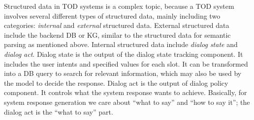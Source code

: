\documentclass[11pt,dvipdfm]{article}
\begin{document}

Structured data in TOD systems is a complex topic, because a TOD system involves several different types of structured data, mainly including two categories: \textit{internal} and \textit{external} structured data.
External structured data include the backend DB or KG, similar to the structured data for semantic parsing as mentioned above. 
Internal structured data include \textit{dialog state} and \textit{dialog act}.
Dialog state is the output of the dialog state tracking component.
It includes the user intents and specified values for each slot. It can be transformed into a DB query to search for relevant information, which may also be used by the model to decide the response.
Dialog act is the output of dialog policy component. It controls what the system response wants to achieve. Basically, for system response generation we care about ``what to say'' and ``how to say it''; the dialog act is the ``what to say'' part.



\end{document}
